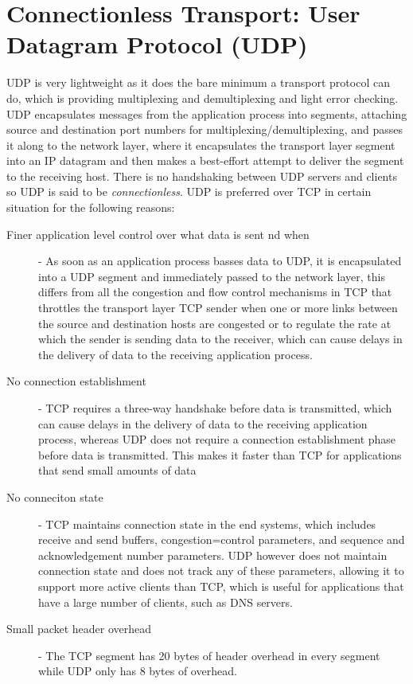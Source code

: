 \documentclass[12pt letter]{report}
\begin{document}
\chapter{Connectionless Transport: User Datagram Protocol (UDP)}

UDP is very lightweight as it does the bare minimum a transport
protocol can do, which is providing multiplexing and demultiplexing
and light error checking. UDP encapsulates messages from the
application process into segments, attaching source and destination
port numbers for multiplexing/demultiplexing, and passes it along to
the network layer, where it encapsulates the transport layer segment
into an IP datagram and then makes a best-effort attempt to deliver
the segment to the receiving host. There is no handshaking between
UDP servers and clients so UDP is said to be \textit{connectionless}.
UDP is preferred over TCP in certain situation for the following reasons:
\begin{description}
  \item[Finer application level control over what data is sent nd when]  -
    As soon as an application process basses data to UDP, it is
    encapsulated into a UDP segment and
    immediately passed to the network layer, this differs from all
    the congestion and flow control mechanisms in TCP that throttles
    the transport layer TCP sender when one or more links between the
    source and destination hosts are congested or to regulate the
    rate at which the sender is sending data to the receiver, which
    can cause delays in the delivery of data to the receiving
    application process.
  \item[No connection establishment] - TCP requires a three-way
    handshake before data is transmitted, which can cause delays in
    the delivery of data to the receiving application process,
    whereas UDP does not require a connection establishment phase
    before data is transmitted. This makes it faster than TCP for
    applications that send small amounts of data
  \item[No conneciton state] - TCP maintains connection state in the
    end systems, which includes receive and send buffers,
    congestion=control parameters, and sequence and acknowledgement
    number parameters. UDP however does not maintain connection state
    and does not track any of these parameters, allowing it to
    support more active clients than TCP, which is useful for
    applications that have a large number of clients, such as DNS servers.
  \item[Small packet header overhead] - The TCP segment has 20 bytes
    of header overhead in every segment while UDP only has 8 bytes of overhead.
\end{description}
\end{document}

